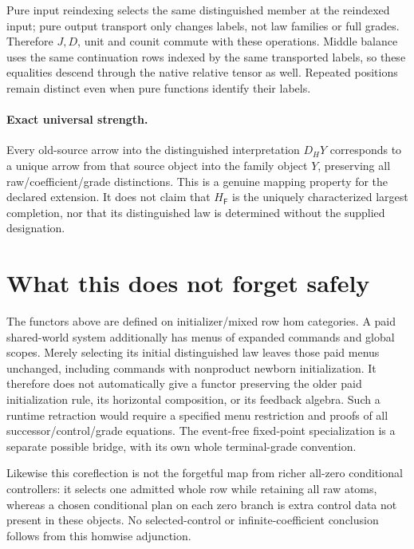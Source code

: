 \documentclass[11pt]{article}
\begin{document}
Pure input reindexing selects the same distinguished member at the reindexed input; pure output transport only changes labels, not law families or full grades. Therefore $J,D$, unit and counit commute with these operations. Middle balance uses the same continuation rows indexed by the same transported labels, so these equalities descend through the native relative tensor as well. Repeated positions remain distinct even when pure functions identify their labels.

\paragraph{Exact universal strength.} Every old-source arrow into the distinguished interpretation $D_HY$ corresponds to a unique arrow from that source object into the family object $Y$, preserving all raw/coefficient/grade distinctions. This is a genuine mapping property for the declared extension. It does not claim that $H_{\mathsf F}$ is the uniquely characterized largest completion, nor that its distinguished law is determined without the supplied designation.

\section{What this does not forget safely}
The functors above are defined on initializer/mixed row hom categories. A paid shared-world system additionally has menus of expanded commands and global scopes. Merely selecting its initial distinguished law leaves those paid menus unchanged, including commands with nonproduct newborn initialization. It therefore does not automatically give a functor preserving the older paid initialization rule, its horizontal composition, or its feedback algebra. Such a runtime retraction would require a specified menu restriction and proofs of all successor/control/grade equations. The event-free fixed-point specialization is a separate possible bridge, with its own whole terminal-grade convention.

Likewise this coreflection is not the forgetful map from richer all-zero conditional controllers: it selects one admitted whole row while retaining all raw atoms, whereas a chosen conditional plan on each zero branch is extra control data not present in these objects. No selected-control or infinite-coefficient conclusion follows from this homwise adjunction.
\end{document}
